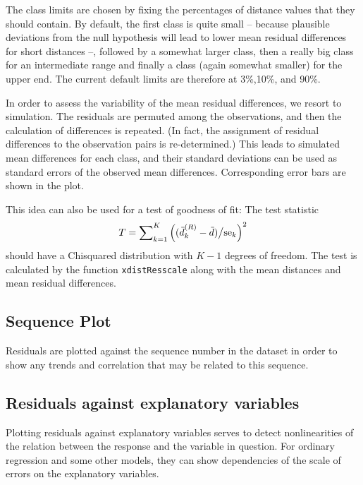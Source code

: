 \documentclass[11pt]{article}
\providecommand{\sups}[1]{^{(#1)}}
\providecommand{\wb}[1]{{}\if Y#1\overline{Y}\else
\kern0.2em\overline{\kern-0.2em#1}\fi}
\begin{document}
The class limits are chosen by fixing the percentages of distance values
that they should contain. By default, the first class is quite small -- 
because plausible deviations from the null hypothesis will lead to lower
mean residual differences for short distances --, followed by a somewhat
larger class, then a really big class for an intermediate range and finally
a class (again somewhat smaller) for the upper end. 
The current default limits are therefore at 3\%,10\%, and 90\%. 

In order to assess the variability of the mean residual differences,
we resort to simulation. The residuals are permuted among the observations,
and then the calculation of differences is repeated.
(In fact, the assignment of residual differences to the observation pairs 
is re-determined.) This leads to simulated mean differences for each class,
and their standard deviations can be used as standard errors of the 
observed mean differences. Corresponding error bars are shown in the
plot. 

This idea can also be used for a test of goodness of fit: The test
statistic 
$$
  T = \sum\nolimits_{k=1}^K \left((\wb d\sups R_k-\wb d)\big/\mbox{se}_k\right)^2
$$
should have a Chisquared distribution with $K-1$ degrees of freedom.
The test is calculated by the function \texttt{xdistResscale} along with
the mean distances and mean residual differences.

\subsection{Sequence Plot}
Residuals are plotted against the sequence number in the dataset in order
to show any trends and correlation that may be related to this sequence.



\subsection{Residuals against explanatory variables}
Plotting residuals against explanatory variables serves to detect
nonlinearities of the relation between the response and the variable in
question. 
For ordinary regression and some other models, they can show dependencies
of the scale of errors on the explanatory variables.
\end{document}
